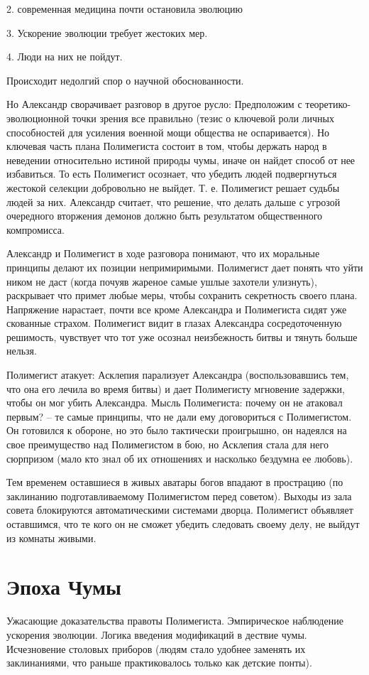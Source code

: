 \documentclass[12pt,a4paper]{article}
\begin{document}
2. современная медицина почти остановила эволюцию

3. Ускорение эволюции требует жестоких мер.

4. Люди на них не пойдут.

Происходит недолгий спор о научной обоснованности.

Но Александр сворачивает разговор в другое русло: Предположим с теоретико-эволюционной точки зрения все правильно (тезис о ключевой роли личных способностей для усиления военной мощи общества не оспаривается). Но ключевая часть плана Полимегиста состоит в том, чтобы держать народ в неведении относительно истиной природы чумы, иначе он найдет способ от нее избавиться. То есть Полимегист осознает, что убедить людей подвергнуться жестокой селекции добровольно не выйдет. Т. е. Полимегист решает судьбы людей за них. Александр считает, что решение, что делать дальше с угрозой очередного вторжения демонов должно быть результатом общественного компромисса.

Александр и Полимегист в ходе разговора понимают, что их моральные принципы делают их позиции непримиримыми. Полимегист дает понять что уйти ником не даст (когда почуяв жареное самые ушлые захотели улизнуть), раскрывает что примет любые меры, чтобы сохранить секретность своего плана. Напряжение нарастает, почти все кроме Александра и Полимегиста сидят уже скованные страхом. Полимегист видит в глазах Александра сосредоточенную решимость, чувствует что тот уже осознал неизбежность битвы и тянуть больше нельзя.

Полимегист атакует: Асклепия парализует Александра (воспользовавшись тем, что она его лечила во время битвы) и дает Полимегисту мгновение задержки, чтобы он мог убить Александра. Мысль Полимегиста: почему он не атаковал первым? -- те самые принципы, что не дали ему договориться с Полимегистом. Он готовился к обороне, но это было тактически проигрышно, он надеялся на свое преимущество над Полимегистом в бою, но Асклепия стала для него сюрпризом (мало кто знал об их отношениях и насколько бездумна ее любовь).

Тем временем оставшиеся в живых аватары богов впадают в прострацию (по заклинанию подготавливаемому Полимегистом перед советом). Выходы из зала совета блокируются автоматическими системами дворца. Полимегист объявляет оставшимся, что те кого он не сможет убедить следовать своему делу, не выйдут из комнаты живыми.


\section*{Эпоха Чумы}
Ужасающие доказательства правоты Полимегиста.
Эмпирическое наблюдение ускорения эволюции.
Логика введения модификаций в дествие чумы.
Исчезновение столовых приборов (людям стало удобнее заменять их заклинаниями, что раньше практиковалось только как детские понты).
\end{document}
